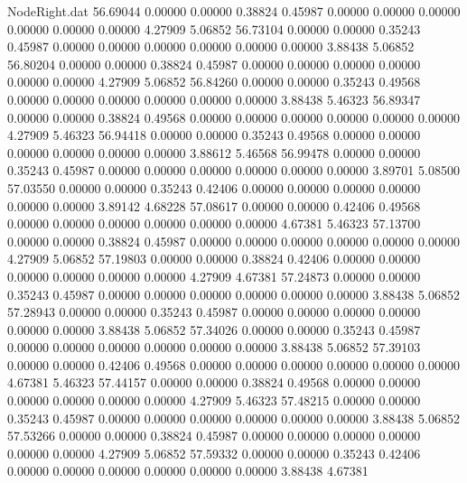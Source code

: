 \begin{filecontents}{NodeRight.dat}
  56.69044    0.00000    0.00000     0.38824    0.45987    0.00000    0.00000    0.00000    0.00000    0.00000    0.00000    4.27909    5.06852
  56.73104    0.00000    0.00000     0.35243    0.45987    0.00000    0.00000    0.00000    0.00000    0.00000    0.00000    3.88438    5.06852
  56.80204    0.00000    0.00000     0.38824    0.45987    0.00000    0.00000    0.00000    0.00000    0.00000    0.00000    4.27909    5.06852
  56.84260    0.00000    0.00000     0.35243    0.49568    0.00000    0.00000    0.00000    0.00000    0.00000    0.00000    3.88438    5.46323
  56.89347    0.00000    0.00000     0.38824    0.49568    0.00000    0.00000    0.00000    0.00000    0.00000    0.00000    4.27909    5.46323
  56.94418    0.00000    0.00000     0.35243    0.49568    0.00000    0.00000    0.00000    0.00000    0.00000    0.00000    3.88612    5.46568
  56.99478    0.00000    0.00000     0.35243    0.45987    0.00000    0.00000    0.00000    0.00000    0.00000    0.00000    3.89701    5.08500
  57.03550    0.00000    0.00000     0.35243    0.42406    0.00000    0.00000    0.00000    0.00000    0.00000    0.00000    3.89142    4.68228
  57.08617    0.00000    0.00000     0.42406    0.49568    0.00000    0.00000    0.00000    0.00000    0.00000    0.00000    4.67381    5.46323
  57.13700    0.00000    0.00000     0.38824    0.45987    0.00000    0.00000    0.00000    0.00000    0.00000    0.00000    4.27909    5.06852
  57.19803    0.00000    0.00000     0.38824    0.42406    0.00000    0.00000    0.00000    0.00000    0.00000    0.00000    4.27909    4.67381
  57.24873    0.00000    0.00000     0.35243    0.45987    0.00000    0.00000    0.00000    0.00000    0.00000    0.00000    3.88438    5.06852
  57.28943    0.00000    0.00000     0.35243    0.45987    0.00000    0.00000    0.00000    0.00000    0.00000    0.00000    3.88438    5.06852
  57.34026    0.00000    0.00000     0.35243    0.45987    0.00000    0.00000    0.00000    0.00000    0.00000    0.00000    3.88438    5.06852
  57.39103    0.00000    0.00000     0.42406    0.49568    0.00000    0.00000    0.00000    0.00000    0.00000    0.00000    4.67381    5.46323
  57.44157    0.00000    0.00000     0.38824    0.49568    0.00000    0.00000    0.00000    0.00000    0.00000    0.00000    4.27909    5.46323
  57.48215    0.00000    0.00000     0.35243    0.45987    0.00000    0.00000    0.00000    0.00000    0.00000    0.00000    3.88438    5.06852
  57.53266    0.00000    0.00000     0.38824    0.45987    0.00000    0.00000    0.00000    0.00000    0.00000    0.00000    4.27909    5.06852
  57.59332    0.00000    0.00000     0.35243    0.42406    0.00000    0.00000    0.00000    0.00000    0.00000    0.00000    3.88438    4.67381

\end{filecontents}
